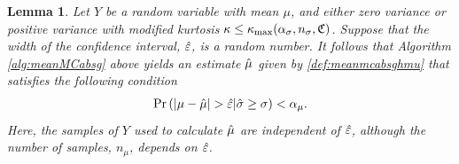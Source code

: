 \documentclass{iitthesis}
\newtheorem{lemma}[theorem]{Lemma}
\theoremstyle{definition}
\begin{document}
\begin{lemma}\label{thm:fixedwidthrandomeps}
Let $Y$ be a random variable with mean $\mu$, and either zero variance or positive variance with modified kurtosis $\kappa \leq \kappa_{\max}(\alpha_\sigma, n_\sigma, \mathfrak{C})$. Suppose that the width of the confidence interval, $\hat{\varepsilon}$, is a random number. It follows that Algorithm \ref{alg:meanMCabsg} above yields an estimate $\hat{\mu}$ given by \eqref{def:meanmcabsghmu} that satisfies the following condition
\begin{align}\label{eq:fixedwidthrandomeps}
\Pr\left( \left \lvert \mu-\hat{\mu} \right \rvert > \hat{\varepsilon} |\hat{\sigma} \geq \sigma \right) <\alpha_\mu.
\end{align}
Here, the samples of $Y$ used to calculate $\hat{\mu}$ are independent of $\hat{\varepsilon}$, although the number of samples, $n_\mu$, depends on $\hat{\varepsilon}$.
\end{lemma}
\end{document}

